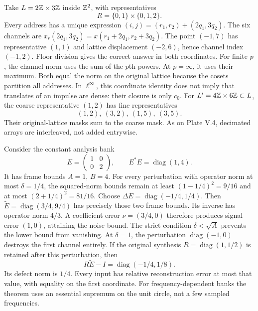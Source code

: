 Take $L=2\mathbb Z\times3\mathbb Z$ inside $\mathbb Z^2$, with representatives
\[
R=\{0,1\}\times\{0,1,2\}.
\]
Every address has a unique expression $(i,j)=(r_1,r_2)+(2q_1,3q_2)$. The six channels are $x_r(2q_1,3q_2)=x(r_1+2q_1,r_2+3q_2)$.
The point $(-1,7)$ has representative $(1,1)$ and lattice displacement $(-2,6)$, hence channel index $(-1,2)$. Floor division gives the correct answer in both coordinates.
For finite $p$, the channel norm uses the sum of the $p$th powers. At $p=\infty$, it uses their maximum. Both equal the norm on the original lattice because the cosets partition all addresses. In $\ell^\infty$, this coordinate identity does not imply that translates of an impulse are dense: their closure is only $c_0$.
For $L'=4\mathbb Z\times6\mathbb Z\subset L$, the coarse representative $(1,2)$ has fine representatives
\[
(1,2),\ (3,2),\ (1,5),\ (3,5).
\]
Their original-lattice masks sum to the coarse mask. As on Plate V.4, decimated arrays are interleaved, not added entrywise.

Consider the constant analysis bank
\[
E=\begin{pmatrix}1&0\\0&2\end{pmatrix},\qquad
E^*E=\operatorname{diag}(1,4).
\]
It has frame bounds $A=1$, $B=4$. For every perturbation with operator norm at most $\delta=1/4$, the squared-norm bounds remain at least $(1-1/4)^2=9/16$ and at most $(2+1/4)^2=81/16$.
Choose $\Delta E=\operatorname{diag}(-1/4,1/4)$. Then $\widetilde E=\operatorname{diag}(3/4,9/4)$ has precisely those two frame bounds. Its inverse has operator norm $4/3$. A coefficient error $\nu=(3/4,0)$ therefore produces signal error $(1,0)$, attaining the noise bound.
The strict condition $\delta<\sqrt A$ prevents the lower bound from vanishing. At $\delta=1$, the perturbation $\operatorname{diag}(-1,0)$ destroys the first channel entirely.
If the original synthesis $R=\operatorname{diag}(1,1/2)$ is retained after this perturbation, then
\[
R\widetilde E-I=\operatorname{diag}(-1/4,1/8).
\]
Its defect norm is $1/4$. Every input has relative reconstruction error at most that value, with equality on the first coordinate. For frequency-dependent banks the theorem uses an essential supremum on the unit circle, not a few sampled frequencies.


